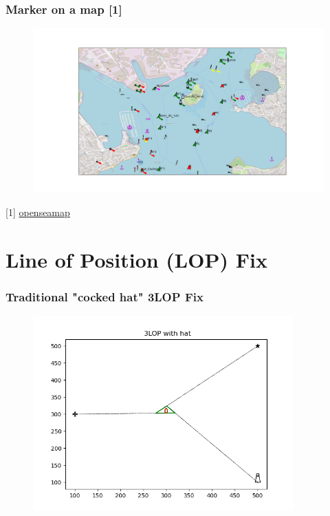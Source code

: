 \documentclass{beamer}
\begin{document}
\begin{frame}
    \frametitle{Marker on a map [1]}
    \begin{figure}[h]
    \centering
    \includegraphics[width=12cm]{./pictures/map_marker.png}
    \end{figure}
    [1] \href{https://www.openseamap.org/}{openseamap} 
\end{frame}

\section{Line of Position (LOP) Fix}

\begin{frame}
    \frametitle{Traditional "cocked hat" 3LOP Fix}
    \begin{figure}[h]
    \centering
    \includegraphics[width=10cm]{./pictures/3LOP_hat.png}
    \end{figure}
\end{frame}
\end{document}
